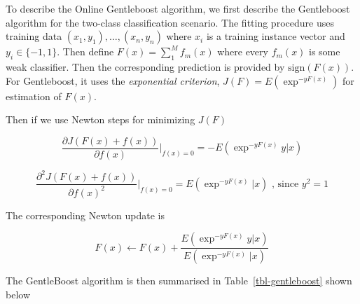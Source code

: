 \documentclass[
]{article}
\begin{document}
To describe the Online Gentleboost algorithm, we first describe the
Gentleboost algorithm for the two-class classification scenario. The
fitting procedure uses training data \((x_1, y_1), \dots, (x_n, y_n)\)
where \(x_i\) is a training instance vector and \(y_i \in \{-1, 1\}\).
Then define \(F(x) = \sum_1^M f_m(x)\) where every \(f_m(x)\) is some
weak classifier. Then the corresponding prediction is provided by
\(\text{sign}(F(x))\). For Gentleboost, it uses the \emph{exponential
criterion}, \(J(F) = E(\exp^{-yF(x)})\) for estimation of \(F(x)\).

Then if we use Newton steps for minimizing \(J(F)\)

\[\frac{\partial J(F(x) + f(x))}{\partial f(x)} \vert_{f(x)=0} = - E(\exp^{-yF(x)} y | x)\]

\[\frac{\partial^2 J(F(x) + f(x))}{\partial f(x)^2} \vert_{f(x)=0} =  E(\exp^{-yF(x)} | x)\text{ , since } y^2=1\]

The corresponding Newton update is

\[F(x) \leftarrow F(x) + \frac{E(\exp^{-yF(x)} y | x)}{E(\exp^{-yF(x)} | x)}\]

The GentleBoost algorithm is then summarised in
Table~\ref{tbl-gentleboost} shown below
\end{document}
